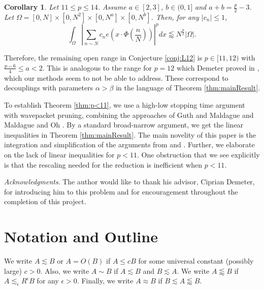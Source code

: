 \documentclass[12pt]{amsart}
\newtheorem{corollary}[theorem]{Corollary}
\begin{document}
\begin{corollary}\label{cor:NewExpSums} Let $11\le p\le 14$. Assume $a\in [2,3]$, $b\in (0,1]$ and $a+b=\frac{p}{2}-3$.  Let $\Omega = [0,N]\times [0,N^2]\times [0,N^a]\times [0,N^b]$. Then, for any $|c_n|\le 1$,  $$\int_\Omega \left|\sum_{n\sim N}c_ne(x\cdot \Phi\left(\frac{n}{N}\right))\right|^{p} dx \lessapprox N^{\frac{p}{2}}|\Omega|.$$
\end{corollary}
%
Therefore, the remaining open range in Conjecture \ref{conj:L12} is $p\in [11, 12)$ with $\frac{p-6}{4}\le a<2$. This is analogous to the range for $p=12$ which Demeter proved in \cite{demeter2021l12squarerootcancellation}, which our methods seem to not be able to address. These correspond to decouplings with parameters $\alpha>\beta$ in the language of Theorem \ref{thm:mainResult}.



To establish Theorem \ref{thm:p<11}, we use a high-low stopping time argument with wavepacket pruning, combining the approaches of Guth and Maldague \cite{Guth_2024} and Maldague and Oh \cite{maldague2024smallcapdecouplingmoment}. By a standard broad-narrow argument, we get the linear inequalities in Theorem \ref{thm:mainResult}. The main novelity of this paper is the integration and simplification of the arguments from \cite{Guth_2024} and \cite{maldague2024smallcapdecouplingmoment}. Further, we elaborate on the lack of linear inequalities for $p<11$. One obstruction that we see explicitly is that the rescaling needed for the reduction is inefficient when $p<11$.

\medskip
\noindent
{\it Acknowledgments}. The author would like to thank his advisor, Ciprian Demeter, for introducing him to this problem and for encouragement throughout the completion of this project.

\section{Notation and Outline}\label{sec:Outline}
We write $A\lesssim B$ or $A= O(B)$ if $A\le cB$ for some universal constant (possibly large) $c>0$. Also, we write $A\sim B$ if $A\lesssim B$ and $B\lesssim A$. We write $A\lessapprox B$ if $A\lesssim_\epsilon R^{\epsilon} B$ for any $\epsilon>0$. Finally, we write $A\approx B$ if $B\lesssim A\lessapprox B $.
\end{document}
